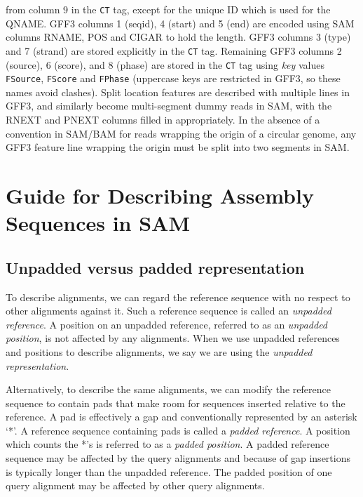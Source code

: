 \documentclass[10pt]{article}
\begin{document}
\begin{enumerate}
\begin{enumerate}[label=\arabic*]
  from column 9 in the {\tt CT} tag, except for the unique ID which
  is used for the QNAME. GFF3 columns 1 (seqid), 4 (start) and 5 (end)
  are encoded using SAM columns RNAME, POS and CIGAR to hold the length.
  GFF3 columns 3 (type) and 7 (strand) are stored explicitly in the
  {\tt CT} tag. Remaining GFF3 columns 2 (source), 6 (score), and
  8 (phase) are stored in the {\tt CT} tag using \emph{key} values
  {\tt FSource}, {\tt FScore} and {\tt FPhase} (uppercase keys are
  restricted in GFF3, so these names avoid clashes). Split location
  features are described with multiple lines in GFF3, and similarly
  become multi-segment dummy reads in SAM, with the {\sf RNEXT} and
  {\sf PNEXT} columns filled in appropriately. In the absence of a
  convention in SAM/BAM for reads wrapping the origin of a circular
  genome, any GFF3 feature line wrapping the origin must be split into
  two segments in SAM.
  \end{enumerate}
\end{enumerate}

\pagebreak

\section{Guide for Describing Assembly Sequences in SAM}

\subsection{Unpadded versus padded representation}

To describe alignments, we can regard the reference sequence with no respect to
other alignments against it.  Such a reference sequence is called an
\emph{unpadded reference}. A position on an unpadded reference, referred to
as an \emph{unpadded position}, is not affected by any alignments. When we use
unpadded references and positions to describe alignments, we say we are using
the \emph{unpadded representation}.

Alternatively, to describe the same alignments, we can modify the reference
sequence to contain pads that make room for sequences inserted relative to the
reference. A pad is effectively a gap and conventionally represented by an
asterisk `*'.  A reference sequence containing pads is called a \emph{padded
reference}. A position which counts the *'s is referred to as a \emph{padded
position}. A padded reference sequence may be affected by the query alignments
and because of gap insertions is typically longer than the unpadded reference.
The padded position of one query alignment may be affected by other query
alignments.
\end{document}
